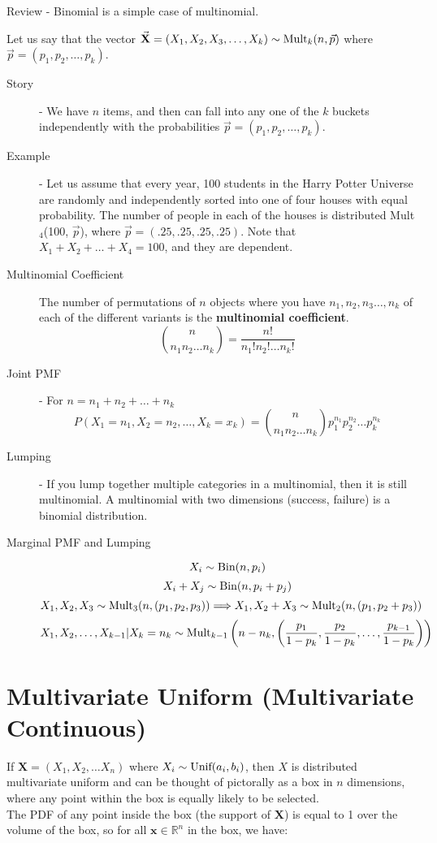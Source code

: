 \documentclass[11.5pt]{article}
\begin{document}
\begin{notes}
	Review - Binomial is a simple case of multinomial.
	
	Let us say that the vector $\vec{\textbf{X}} = (X_1, X_2, X_3, \dots, X_k) \sim \textnormal{Mult}_k(n, \vec{p})$  where $\vec{p} = (p_1, p_2, \dots, p_k)$.
\begin{description}
	\item[Story] - We have $n$ items, and then can fall into any one of the $k$ buckets independently with the probabilities $\vec{p} = (p_1, p_2, \dots, p_k)$.
	\item[Example] - Let us assume that every year, 100 students in the Harry Potter Universe are randomly and independently sorted into one of four houses with equal probability. The number of people in each of the houses is distributed Mult$_4$(100, $\vec{p}$), where $\vec{p} = (.25, .25, .25, .25)$.
		Note that $X_1 + X_2 + \dots + X_4 = 100$, and they are dependent.
	\item[Multinomial Coefficient] The number of permutations of $n$ objects where you have $n_1, n_2, n_3 \dots, n_k$ of each of the different variants is the \textbf{multinomial coefficient}.
		\[{n \choose n_1n_2\dots n_k} = \frac{n!}{n_1!n_2!\dots n_k!}\]
	\item[Joint PMF] - For $n = n_1 + n_2 + \dots + n_k$
		\[P(X_1 = n_1, X_2 = n_2, \dots, X_k = x_k) = {n \choose n_1n_2\dots n_k}p_1^{n_1}p_2^{n_2}\dots p_k^{n_k}\]
	\item[Lumping] - If you lump together multiple categories in a multinomial, then it is still multinomial. A multinomial with two dimensions (success, failure) is a binomial distribution.
	\item[Marginal PMF and Lumping]
		\[X_i \sim \textrm{Bin}(n, p_i)\]
		\[X_i + X_j \sim \textrm{Bin}(n, p_i + p_j)\]
		\[X_1, X_2, X_3 \sim \textrm{Mult}_3(n, (p_1, p_2, p_3)) \Longrightarrow X_1, X_2 + X_3 \sim \textrm{Mult}_2(n, (p_1, p_2 + p_3))\]
		\[X_1, X_2, \dots, X_{k-1} | X_k = n_k \sim \textrm{Mult}_{k-1}\left(n - n_k, \left(\frac{p_1}{1 - p_k}, \frac{p_2}{1 - p_k}, \dots, \frac{p_{k-1}}{1 - p_k}\right)\right)\]
\end{description}

\section*{Multivariate Uniform (Multivariate Continuous)}
If $\mathbf{X} = (X_1, X_2, \ldots X_n)$ where $X_i \sim \textrm{Unif}(a_i, b_i)$, then $X$ is distributed multivariate uniform and can be thought of pictorally as a box in $n$ dimensions, where any point within the box is equally likely to be selected. \\
The PDF of any point inside the box (the support of $\mathbf{X}$) is equal to 1 over the volume of the box, so for all $\mathbf{x} \in \mathbb{R}^n$ in the box, we have:  


\end{notes}
\end{document}

